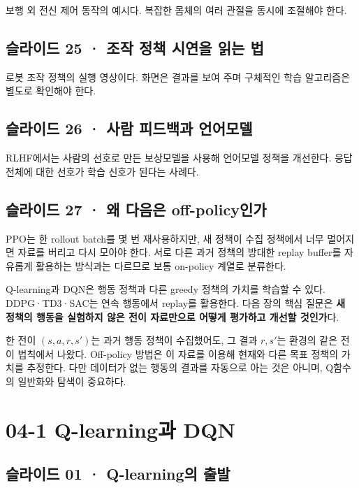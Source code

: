 \documentclass[11pt,a4paper]{article}
\begin{document}
보행 외 전신 제어 동작의 예시다. 복잡한 몸체의 여러 관절을 동시에 조절해야 한다.\par

\subsection{슬라이드 25 · 조작 정책 시연을 읽는 법}

로봇 조작 정책의 실행 영상이다. 화면은 결과를 보여 주며 구체적인 학습 알고리즘은 별도로 확인해야 한다.\par

\subsection{슬라이드 26 · 사람 피드백과 언어모델}

RLHF에서는 사람의 선호로 만든 보상모델을 사용해 언어모델 정책을 개선한다. 응답 전체에 대한 선호가 학습 신호가 된다는 사례다.\par

\subsection{슬라이드 27 · 왜 다음은 off-policy인가}

PPO는 한 rollout batch를 몇 번 재사용하지만, 새 정책이 수집 정책에서 너무 멀어지면 자료를 버리고 다시 모아야 한다. 서로 다른 과거 정책의 방대한 replay buffer를 자유롭게 활용하는 방식과는 다르므로 보통 on-policy 계열로 분류한다.\par

Q-learning과 DQN은 행동 정책과 다른 greedy 정책의 가치를 학습할 수 있다. DDPG·TD3·SAC는 연속 행동에서 replay를 활용한다. 다음 장의 핵심 질문은 \textbf{새 정책의 행동을 실험하지 않은 전이 자료만으로 어떻게 평가하고 개선할 것인가}다.\par

한 전이 $(s,a,r,s')$는 과거 행동 정책이 수집했어도, 그 결과 $r,s'$는 환경의 같은 전이 법칙에서 나왔다. Off-policy 방법은 이 자료를 이용해 현재와 다른 목표 정책의 가치를 추정한다. 다만 데이터가 없는 행동의 결과를 자동으로 아는 것은 아니며, Q함수의 일반화와 탐색이 중요하다.\par

\clearpage
\section{04-1 Q-learning과 DQN}


\subsection{슬라이드 01 · Q-learning의 출발}
\end{document}
